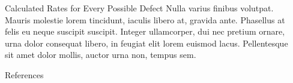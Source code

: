 \documentclass[final]{beamer}
\newlength{\sepwidth}
\newlength{\colwidth}
\newcommand{\separatorcolumn}{\begin{column}{\sepwidth}\end{column}}
\begin{document}
\begin{frame}[t]
\begin{columns}[t]
\begin{column}{\colwidth}
\begin{block}{Calculated Rates for Every Possible Defect}
    Nulla varius finibus volutpat. Mauris molestie lorem tincidunt, iaculis
    libero at, gravida ante. Phasellus at felis eu neque suscipit suscipit.
    Integer ullamcorper, dui nec pretium ornare, urna dolor consequat libero,
    in feugiat elit lorem euismod lacus. Pellentesque sit amet dolor mollis,
    auctor urna non, tempus sem.

  \end{block}

  \begin{block}{References}

    \nocite{*}
    \footnotesize{}

  \end{block}

\end{column}

\separatorcolumn
\end{columns}
\end{frame}
\end{document}

